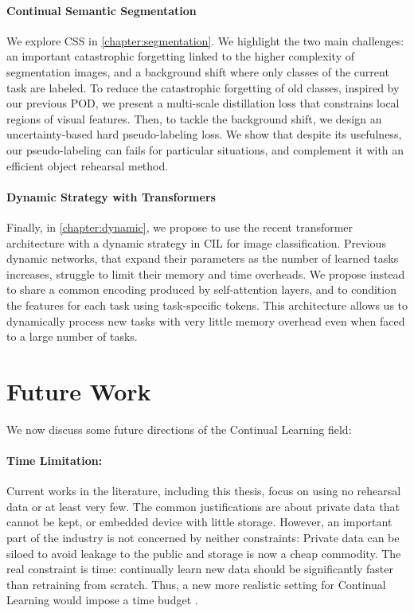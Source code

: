 \paragraph{Continual Semantic Segmentation} We explore \ac{CSS} in \autoref{chapter:segmentation}.
We highlight the two main challenges: an important catastrophic forgetting linked to the higher
complexity of segmentation images, and a background shift where only classes of the current task are
labeled. To reduce the catastrophic forgetting of old classes, inspired by our previous POD, we
present a multi-scale distillation loss that constrains local regions of visual features. Then, to
tackle the background shift, we design an uncertainty-based hard pseudo-labeling loss. We show that
despite its usefulness, our pseudo-labeling can fails for particular situations, and complement it
with an efficient object rehearsal method.

\paragraph{Dynamic Strategy with Transformers} Finally, in \autoref{chapter:dynamic}, we propose to
use the recent transformer architecture with a dynamic strategy in \acf{CIL} for image
classification. Previous dynamic networks, that expand their parameters as the number of learned
tasks increases, struggle to limit their memory and time overheads. We propose instead to share a
common encoding produced by self-attention layers, and to condition the features for each task using
task-specific tokens. This architecture allows us to dynamically process new tasks with very little
memory overhead even when faced to a large number of tasks.

\section{Future Work}

We now discuss some future directions of the Continual Learning field:

\paragraph{Time Limitation:} Current works in the literature, including this thesis, focus on using
no rehearsal data or at least very few. The common justifications are about private data that cannot
be kept, or embedded device with little storage. However, an important part of the industry is not
concerned by neither constraints: Private data can be siloed to avoid leakage to the public and
storage is now a cheap commodity. The real constraint is time: continually learn new data should be
significantly faster than retraining from scratch. Thus, a new more realistic setting for Continual
Learning would impose a time budget \citep{veniat2018budgetedlearning}.

